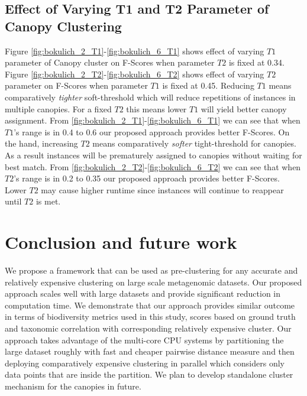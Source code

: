 \documentclass[10pt, conference, compsocconf]{IEEEtran}
\begin{document}
\subsection{\textbf{Effect of Varying T1 and T2 Parameter of Canopy Clustering}}
Figure \ref{fig:bokulich_2_T1}-\ref{fig:bokulich_6_T1} shows effect of varying $T1$ parameter of Canopy cluster on F-Scores when parameter $T2$ is fixed at 0.34. Figure \ref{fig:bokulich_2_T2}-\ref{fig:bokulich_6_T2} shows effect of varying $T2$ parameter on F-Scores when parameter $T1$ is fixed at 0.45. Reducing $T1$ means comparatively \textit{tighter} soft-threshold which will reduce repetitions of instances in multiple canopies. For a fixed $T2$ this means lower $T1$ will yield better canopy assignment. From \ref{fig:bokulich_2_T1}-\ref{fig:bokulich_6_T1} we can see that when $T1$'s range is in 0.4 to 0.6 our proposed approach provides better F-Scores. On the hand, increasing $T2$ means comparatively \textit{softer} tight-threshold for canopies. As a result instances will be prematurely assigned to canopies without waiting for best match. From \ref{fig:bokulich_2_T2}-\ref{fig:bokulich_6_T2} we can see that when $T2$'s range  is in 0.2 to 0.35 our proposed approach provides better F-Scores. Lower $T2$ may cause higher runtime since instances will continue to reappear until $T2$ is met.                   



\section{Conclusion and future work}

We propose a framework that can be used as pre-clustering for any accurate and relatively expensive clustering on large scale metagenomic datasets. Our proposed approach scales well with large datasets and provide significant reduction in computation time. We demonstrate that our approach provides similar outcome in terms of biodiversity metrics used in this study, scores based on ground truth and taxonomic correlation with corresponding relatively expensive cluster. Our approach takes advantage of the multi-core CPU systems by partitioning the large dataset roughly with fast and cheaper pairwise distance measure and then deploying comparatively expensive clustering in parallel which considers only data points that are inside the partition. We plan to develop standalone cluster mechanism for the canopies in future.   





\end{document}
